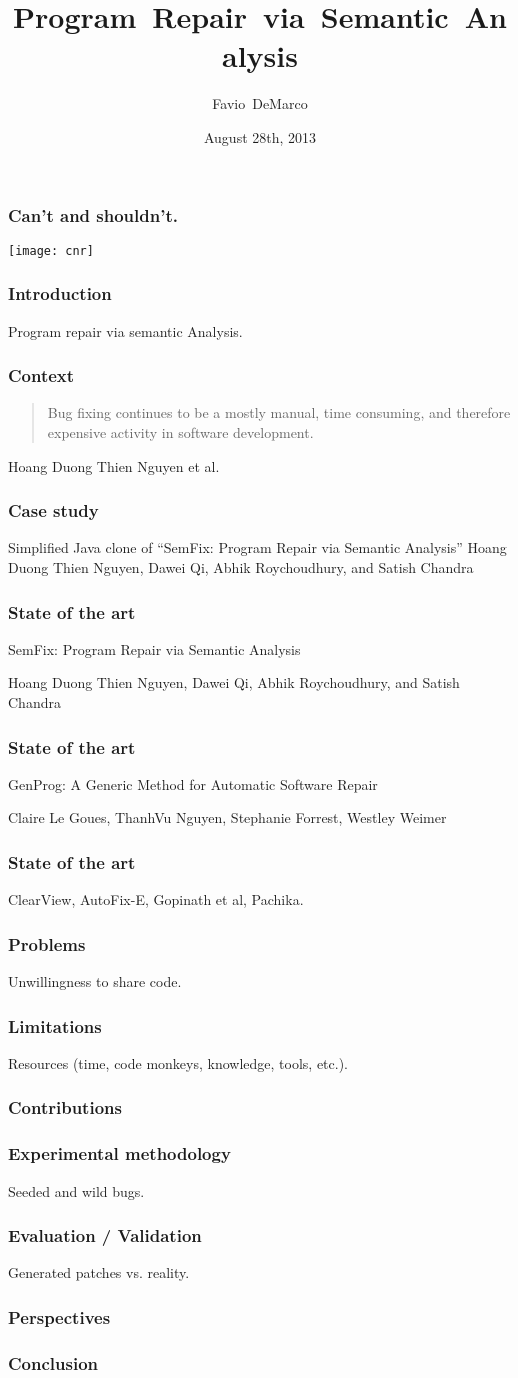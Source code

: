 \documentclass{beamer}
\title
  [Program Repair via Semantic Analysis]
  {Program~Repair~via~Semantic~Analysis}
\author[DeMarco]{Favio~DeMarco}
\institute[U.B.A. - INRIA]{Universidad de Buenos Aires - INRIA}
\date[08/28/2013]{August 28th, 2013}
\begin{document}
 \frame
  {
    \frametitle{Can't and shouldn't.}
\texttt{[image: cnr]}
}


\frame
  {
    \titlepage
  }

  \frame
  {
    \frametitle{Introduction}
    Program repair via semantic Analysis.
  }

  \frame
  {
    \frametitle{Context}
    \begin{quote}
    Bug fixing continues to be a mostly manual, time consuming, and therefore expensive activity in software development.
    \end{quote}
    Hoang Duong Thien Nguyen et al.
}

  \frame
  {
    \frametitle{Case study}
    Simplified Java clone of ``SemFix: Program Repair via Semantic Analysis''
Hoang Duong Thien Nguyen, Dawei Qi, Abhik Roychoudhury, and Satish Chandra
  }

{
  \frame
  {
    \frametitle{State of the art}
    SemFix: Program Repair via Semantic Analysis

Hoang Duong Thien Nguyen, Dawei Qi, Abhik Roychoudhury, and Satish Chandra
  }
}

{
  \frame
  {
    \frametitle{State of the art}
    GenProg: A Generic Method for Automatic Software Repair
    
Claire Le Goues, ThanhVu Nguyen, Stephanie Forrest, Westley Weimer
  }
}

{
  \frame
  {
    \frametitle{State of the art}
    ClearView, AutoFix-E, Gopinath et al, Pachika.
  }
}

  \frame
  {
    \frametitle{Problems}
    Unwillingness to share code.
  }
  
  \frame
  {
    \frametitle{Limitations}
    Resources (time, code monkeys, knowledge, tools, etc.).
  }

  \frame
  {
    \frametitle{Contributions}
  }


  \frame
  {
    \frametitle{Experimental methodology}
    Seeded and wild bugs.
  }
  
  \frame
  {
    \frametitle{Evaluation / Validation}
    Generated patches vs. reality.
  }
  
  \frame
  {
    \frametitle{Perspectives}
    
  }
  
  \frame
  {
    \frametitle{Conclusion}
    
  }
  
\end{document}
